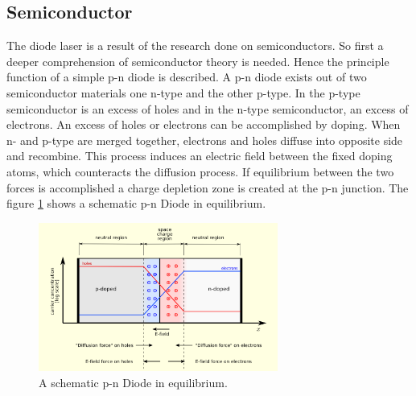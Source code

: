 \subsection{Semiconductor}
\label{subsec:Semiconductor}

The diode laser is a result of the research done on semiconductors.
So first a deeper comprehension of semiconductor theory is needed.
Hence the principle function of a simple p-n diode is described.
A p-n diode exists out of two semiconductor materials one
n-type and the other p-type.
In the p-type semiconductor is an excess of holes
and in the n-type semiconductor, an excess of electrons.
An excess of holes or electrons can be accomplished by doping.
When n- and p-type are merged together,
electrons and holes diffuse into opposite side and recombine.
This process induces an electric field between the fixed doping atoms, which
counteracts the diffusion process.
If equilibrium between the two forces is accomplished
a charge depletion zone is created
at the p-n junction.
The figure \ref{fig:equi} shows
a schematic p-n Diode in equilibrium.

\begin{figure}
\centering
\includegraphics[width=0.7\textwidth]{equilibrium.png}
\caption{A schematic p-n Diode in equilibrium.
\cite{wiki_diode}}
\label{fig:equi}
\end{figure}


